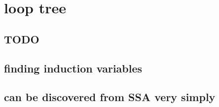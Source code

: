 \applynumberofpages\chapter{loop tree }
\section{TODO}

\section{finding induction variables}
\section{can be discovered from SSA very simply}

